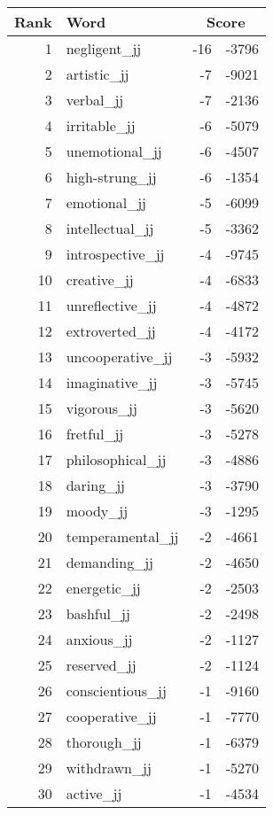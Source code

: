 \begin{longtable}[!htbp]{| rlr@{.}l |}
    \hline
    \textbf{Rank} & \textbf{Word} & \multicolumn{2}{c|}{\textbf{Score}} \\
    \hline
    \endhead
    1 & negligent\_jj & -16 & -3796 \\
    2 & artistic\_jj & -7 & -9021 \\
    3 & verbal\_jj & -7 & -2136 \\
    4 & irritable\_jj & -6 & -5079 \\
    5 & unemotional\_jj & -6 & -4507 \\
    6 & high-strung\_jj & -6 & -1354 \\
    7 & emotional\_jj & -5 & -6099 \\
    8 & intellectual\_jj & -5 & -3362 \\
    9 & introspective\_jj & -4 & -9745 \\
    10 & creative\_jj & -4 & -6833 \\
    11 & unreflective\_jj & -4 & -4872 \\
    12 & extroverted\_jj & -4 & -4172 \\
    13 & uncooperative\_jj & -3 & -5932 \\
    14 & imaginative\_jj & -3 & -5745 \\
    15 & vigorous\_jj & -3 & -5620 \\
    16 & fretful\_jj & -3 & -5278 \\
    17 & philosophical\_jj & -3 & -4886 \\
    18 & daring\_jj & -3 & -3790 \\
    19 & moody\_jj & -3 & -1295 \\
    20 & temperamental\_jj & -2 & -4661 \\
    21 & demanding\_jj & -2 & -4650 \\
    22 & energetic\_jj & -2 & -2503 \\
    23 & bashful\_jj & -2 & -2498 \\
    24 & anxious\_jj & -2 & -1127 \\
    25 & reserved\_jj & -2 & -1124 \\
    26 & conscientious\_jj & -1 & -9160 \\
    27 & cooperative\_jj & -1 & -7770 \\
    28 & thorough\_jj & -1 & -6379 \\
    29 & withdrawn\_jj & -1 & -5270 \\
    30 & active\_jj & -1 & -4534 \\

\end{longtable}
